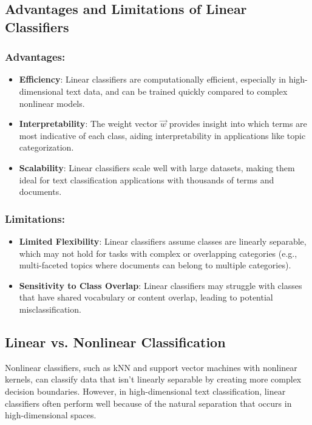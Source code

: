 \documentclass{article}
\begin{document}
\subsection{Advantages and Limitations of Linear Classifiers}

\subsubsection*{Advantages:}
\begin{itemize}
    \item \textbf{Efficiency}: Linear classifiers are computationally efficient, especially in high-dimensional text data, and can be trained quickly compared to complex nonlinear models.
    \item \textbf{Interpretability}: The weight vector \(\vec{w}\) provides insight into which terms are most indicative of each class, aiding interpretability in applications like topic categorization.
    \item \textbf{Scalability}: Linear classifiers scale well with large datasets, making them ideal for text classification applications with thousands of terms and documents.
\end{itemize}

\subsubsection*{Limitations:}
\begin{itemize}
    \item \textbf{Limited Flexibility}: Linear classifiers assume classes are linearly separable, which may not hold for tasks with complex or overlapping categories (e.g., multi-faceted topics where documents can belong to multiple categories).
    \item \textbf{Sensitivity to Class Overlap}: Linear classifiers may struggle with classes that have shared vocabulary or content overlap, leading to potential misclassification.
\end{itemize}

\subsection{Linear vs. Nonlinear Classification}

Nonlinear classifiers, such as kNN and support vector machines with nonlinear kernels, can classify data that isn’t linearly separable by creating more complex decision boundaries. However, in high-dimensional text classification, linear classifiers often perform well because of the natural separation that occurs in high-dimensional spaces.
\end{document}
